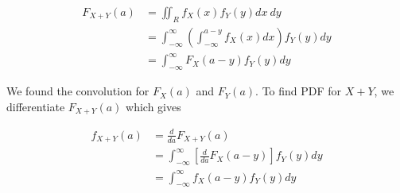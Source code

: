 \documentclass[12pt, a4paper]{article}
\begin{document}
\begin{align*}
F_{X+Y}(a)&=\iint_R f_X(x)f_Y(y) dx\:dy \\
&=\int_{-\infty}^\infty \left( \int_{-\infty}^{a-y} f_X(x) dx \right) f_Y(y) dy \\
&=\int_{-\infty}^\infty F_X(a-y) f_Y(y) dy
\end{align*}

We found the convolution for $F_X(a)$ and $F_Y(a)$. To find PDF for $X+Y$, we differentiate $F_{X+Y}(a)$ which gives

\begin{align*}
f_{X+Y}(a)&=\frac{d}{da} F_{X+Y}(a) \\
&=\int_{-\infty}^\infty \left[ \frac{d}{da}F_X(a-y) \right] f_Y(y) dy \\
&=\int_{-\infty}^\infty f_X(a-y) f_Y(y) dy
\end{align*}
\end{document}
